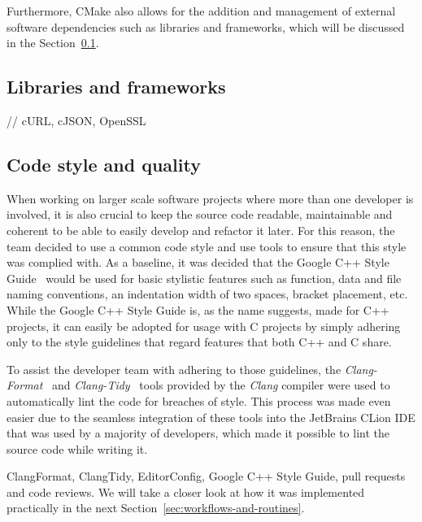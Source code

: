 
Furthermore, CMake also allows for the addition and management of external software dependencies such as libraries
and frameworks, which will be discussed in the Section~\ref{subsec:libraries-and-frameworks}.

\subsection{Libraries and frameworks}\label{subsec:libraries-and-frameworks}

// cURL, cJSON, OpenSSL

\subsection{Code style and quality}\label{subsec:code-style-and-quality}

When working on larger scale software projects where more than one developer is involved, it is also crucial to keep the
source code readable, maintainable and coherent to be able to easily develop and refactor it later.
For this reason, the team decided to use a common code style and use tools to ensure that this style was complied with.
As a baseline, it was decided that the Google C++ Style Guide~\cite{google-style} would be used for basic stylistic
features such as function, data and file naming conventions, an indentation width of two spaces, bracket placement, etc.
While the Google C++ Style Guide is, as the name suggests, made for C++ projects, it can easily be adopted for usage
with C projects by simply adhering only to the style guidelines that regard features that both C++ and C share.

To assist the developer team with adhering to those guidelines, the \textit{Clang-Format}~\cite{clang-format} and
\textit{Clang-Tidy}~\cite{clang-tidy} tools provided by the \textit{Clang} compiler were used to automatically lint
the code for breaches of style.
This process was made even easier due to the seamless integration of these tools into the JetBrains CLion IDE that was
used by a majority of developers, which made it possible to lint the source code while writing it.

ClangFormat, ClangTidy, EditorConfig, Google C++ Style Guide, pull requests and code reviews.
We will take a closer look at how it was implemented practically in the next Section~\ref{sec:workflows-and-routines}.

